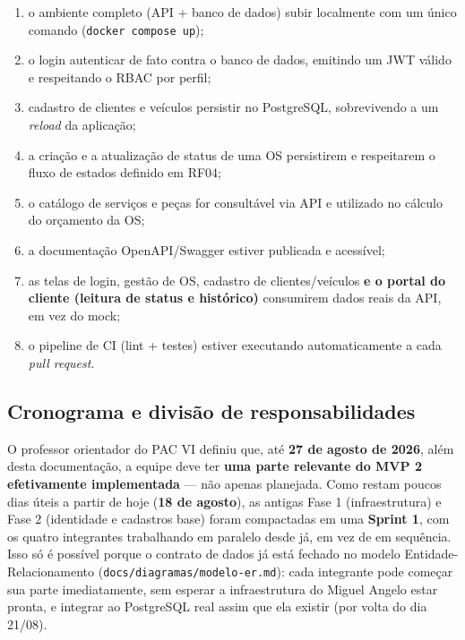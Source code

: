\documentclass[11pt, a4paper]{article}
\begin{document}
\begin{enumerate}
    \item o ambiente completo (API + banco de dados) subir localmente com um único comando (\texttt{docker compose up});
    \item o login autenticar de fato contra o banco de dados, emitindo um JWT válido e respeitando o RBAC por perfil;
    \item cadastro de clientes e veículos persistir no PostgreSQL, sobrevivendo a um \emph{reload} da aplicação;
    \item a criação e a atualização de status de uma OS persistirem e respeitarem o fluxo de estados definido em RF04;
    \item o catálogo de serviços e peças for consultável via API e utilizado no cálculo do orçamento da OS;
    \item a documentação OpenAPI/Swagger estiver publicada e acessível;
    \item as telas de login, gestão de OS, cadastro de clientes/veículos \textbf{e o portal do cliente (leitura de status e histórico)} consumirem dados reais da API, em vez do mock;
    \item o pipeline de CI (lint + testes) estiver executando automaticamente a cada \emph{pull request}.
\end{enumerate}

\subsection{Cronograma e divisão de responsabilidades}
\label{sec:cronograma-mvp2}

O professor orientador do PAC VI definiu que, até \textbf{27 de agosto de 2026}, além desta documentação, a equipe deve ter \textbf{uma parte relevante do MVP 2 efetivamente implementada} --- não apenas planejada. Como restam poucos dias úteis a partir de hoje (\textbf{18 de agosto}), as antigas Fase 1 (infraestrutura) e Fase 2 (identidade e cadastros base) foram compactadas em uma \textbf{Sprint 1}, com os quatro integrantes trabalhando em paralelo desde já, em vez de em sequência. Isso só é possível porque o contrato de dados já está fechado no modelo Entidade-Relacionamento (\texttt{docs/diagramas/modelo-er.md}): cada integrante pode começar sua parte imediatamente, sem esperar a infraestrutura do Miguel Angelo estar pronta, e integrar ao PostgreSQL real assim que ela existir (por volta do dia 21/08).
\end{document}

